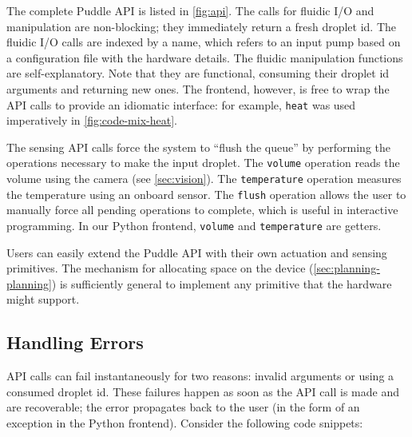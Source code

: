 \documentclass{jpaper}
\newcommand\pavel[1]{\todo[color=blue!60]{\sf #1}}
\begin{document}
The complete Puddle API is listed in \autoref{fig:api}.
The calls for fluidic I/O and manipulation are non-blocking; they immediately return a fresh droplet id.
The fluidic I/O calls are indexed by a name, which refers to an input pump based on a configuration file with the hardware details.
The fluidic manipulation functions are self-explanatory.
Note that they are functional, consuming their droplet id arguments and returning new ones.
The frontend, however, is free to wrap the API calls to provide an idiomatic interface:
for example, \lstinline{heat} was used imperatively in \autoref{fig:code-mix-heat}.
\pavel{call out to linearity earlier}


The sensing API calls force the system to ``flush the queue'' by performing the operations necessary to make the input droplet.
The \lstinline{volume} operation reads the volume using the camera (see \autoref{sec:vision}).
The \lstinline{temperature} operation measures the temperature using an onboard sensor.
The \lstinline{flush} operation allows the user to manually force all pending operations to complete, which is useful in interactive programming.
In our Python frontend, \lstinline{volume} and \lstinline{temperature} are getters.

Users can easily extend the Puddle API with their own actuation and sensing primitives.
The mechanism for allocating space on the device (\autoref{sec:planning-planning}) is sufficiently general to implement any primitive that the hardware might support.

\subsection{Handling Errors}

API calls can fail instantaneously for two reasons: invalid arguments or using a consumed droplet id.
These failures happen as soon as the API call is made and are recoverable; the error propagates back to the user (in the form of an exception in the Python frontend).
Consider the following code snippets:
\end{document}

